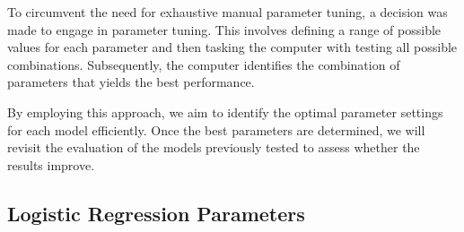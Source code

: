 \documentclass[conference]{IEEEtran}
\begin{document}
To circumvent the need for exhaustive manual parameter tuning, a decision was made to engage in parameter tuning. This involves defining a range of possible values for each parameter and then tasking the computer with testing all possible combinations. Subsequently, the computer identifies the combination of parameters that yields the best performance.

By employing this approach, we aim to identify the optimal parameter settings for each model efficiently. Once the best parameters are determined, we will revisit the evaluation of the models previously tested to assess whether the results improve.

\subsection{Logistic Regression Parameters}

\begin{table}[htbp]
\centering
{}
\caption{Possible Values for Logistic Regression Parameters}
\label{tab:logistic-reg-params}
\end{table}

\begin{table}[htbp]
\centering
{}
\caption{Logistic Regression Report}
\label{tab:svm-comparison}
\end{table}
\end{document}
